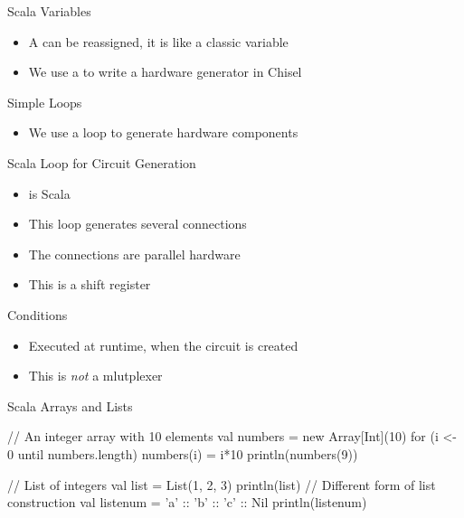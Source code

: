 \begin{frame}[fragile]{Scala Variables}
\begin{itemize}
\item A  can be reassigned, it is like a classic variable
\item We use a  to write a hardware generator in Chisel
\end{itemize}
\end{frame}

\begin{frame}[fragile]{Simple Loops}
\begin{itemize}
\item We use a loop to generate hardware components
\end{itemize}
\end{frame}

\begin{frame}[fragile]{Scala  Loop for Circuit Generation}
\begin{itemize}
\item {} is Scala
\item This loop generates several connections
\item The connections are parallel hardware
\item This is a shift register
\end{itemize}
\end{frame}

\begin{frame}[fragile]{Conditions}
\begin{itemize}
\item Executed at runtime, when the circuit is created
\item This is \emph{not} a mlutplexer
\end{itemize}
\end{frame}

\begin{frame}[fragile]{Scala Arrays and Lists}
\begin{chisel}
// An integer array with 10 elements
val numbers = new Array[Int](10)
for (i <- 0 until numbers.length) {
  numbers(i) = i*10
}
println(numbers(9))


// List of integers
val list = List(1, 2, 3)
println(list)
// Different form of list construction
val listenum = 'a' :: 'b' :: 'c' :: Nil
println(listenum)
\end{chisel}
\end{frame}


